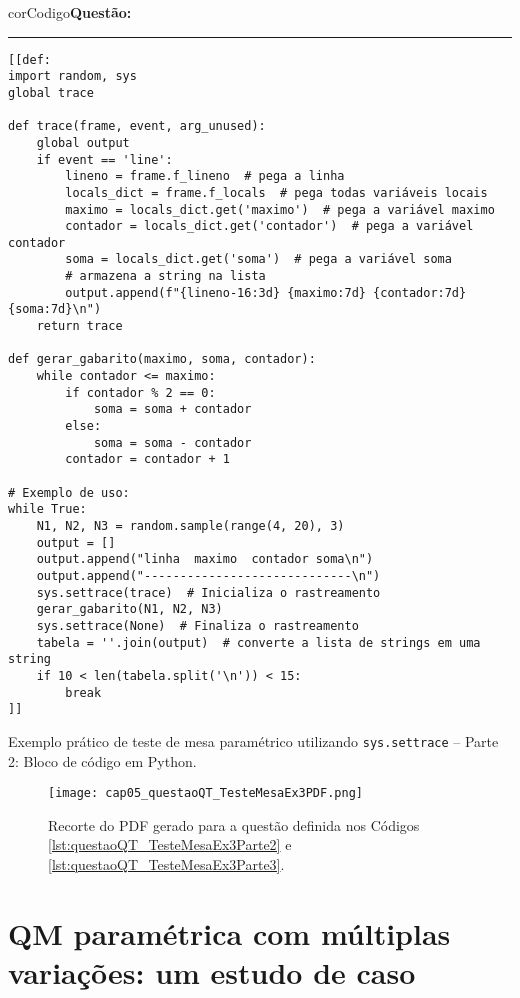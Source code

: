 \begin{listing}[!ht]
\begin{myboxCode}{corCodigo}{\textbf{Questão: }}\vspace{3mm}
\hrule
\begin{verbatim}
[[def:
import random, sys
global trace

def trace(frame, event, arg_unused):
    global output
    if event == 'line':
        lineno = frame.f_lineno  # pega a linha
        locals_dict = frame.f_locals  # pega todas variáveis locais
        maximo = locals_dict.get('maximo')  # pega a variável maximo
        contador = locals_dict.get('contador')  # pega a variável contador
        soma = locals_dict.get('soma')  # pega a variável soma
        # armazena a string na lista
        output.append(f"{lineno-16:3d} {maximo:7d} {contador:7d} {soma:7d}\n")  
    return trace

def gerar_gabarito(maximo, soma, contador):
    while contador <= maximo:
        if contador % 2 == 0:
            soma = soma + contador
        else:
            soma = soma - contador
        contador = contador + 1

# Exemplo de uso:
while True:
    N1, N2, N3 = random.sample(range(4, 20), 3)
    output = []
    output.append("linha  maximo  contador soma\n")
    output.append("-----------------------------\n")
    sys.settrace(trace)  # Inicializa o rastreamento
    gerar_gabarito(N1, N2, N3)
    sys.settrace(None)  # Finaliza o rastreamento
    tabela = ''.join(output)  # converte a lista de strings em uma string
    if 10 < len(tabela.split('\n')) < 15:
        break
]]
\end{verbatim}
\end{myboxCode}
\caption{Exemplo prático de teste de mesa paramétrico utilizando \texttt{sys.settrace} -- Parte 2: Bloco de código em Python.}
\label{lst:questaoQT_TesteMesaEx3Parte3}
\end{listing}

\begin{figure}[!ht]
  \texttt{[image: cap05\_questaoQT\_TesteMesaEx3PDF.png]}
  \caption{Recorte do PDF gerado para a questão definida nos Códigos \ref{lst:questaoQT_TesteMesaEx3Parte2} e \ref{lst:questaoQT_TesteMesaEx3Parte3}.}
  \label{fig:cap05_questaoQT_TesteMesaEx3PDF}
\end{figure}


\section{QM paramétrica com múltiplas variações: um estudo de caso}\label{sec:QMparametricaExtra}


